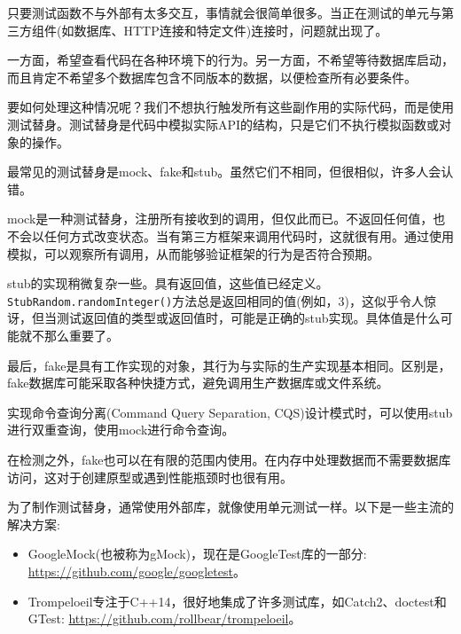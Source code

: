 
只要测试函数不与外部有太多交互，事情就会很简单很多。当正在测试的单元与第三方组件(如数据库、HTTP连接和特定文件)连接时，问题就出现了。

一方面，希望查看代码在各种环境下的行为。另一方面，不希望等待数据库启动，而且肯定不希望多个数据库包含不同版本的数据，以便检查所有必要条件。

要如何处理这种情况呢？我们不想执行触发所有这些副作用的实际代码，而是使用测试替身。测试替身是代码中模拟实际API的结构，只是它们不执行模拟函数或对象的操作。

最常见的测试替身是mock、fake和stub。虽然它们不相同，但很相似，许多人会认错。


mock是一种测试替身，注册所有接收到的调用，但仅此而已。不返回任何值，也不会以任何方式改变状态。当有第三方框架来调用代码时，这就很有用。通过使用模拟，可以观察所有调用，从而能够验证框架的行为是否符合预期。

stub的实现稍微复杂一些。具有返回值，这些值已经定义。\texttt{StubRandom.randomInteger()}方法总是返回相同的值(例如，3)，这似乎令人惊讶，但当测试返回值的类型或返回值时，可能是正确的stub实现。具体值是什么可能就不那么重要了。

最后，fake是具有工作实现的对象，其行为与实际的生产实现基本相同。区别是，fake数据库可能采取各种快捷方式，避免调用生产数据库或文件系统。

实现命令查询分离(Command Query Separation, CQS)设计模式时，可以使用stub进行双重查询，使用mock进行命令查询。


在检测之外，fake也可以在有限的范围内使用。在内存中处理数据而不需要数据库访问，这对于创建原型或遇到性能瓶颈时也很有用。


为了制作测试替身，通常使用外部库，就像使用单元测试一样。以下是一些主流的解决方案:

\begin{itemize}
\item 
GoogleMock(也被称为gMock)，现在是GoogleTest库的一部分: \url{https://github.com/google/googletest}。

\item 
Trompeloeil专注于C++14，很好地集成了许多测试库，如Catch2、doctest和GTest: \url{https://github.com/rollbear/trompeloeil}。
\end{itemize}

